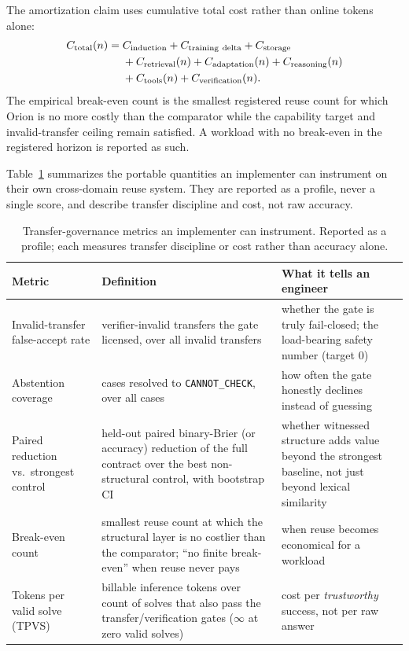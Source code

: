 The amortization claim uses cumulative total cost rather than online tokens alone:
\[
\begin{aligned}
C_{\rm total}(n)={}&C_{\rm induction}+C_{\rm training\ delta}+C_{\rm storage}\\
&+C_{\rm retrieval}(n)+C_{\rm adaptation}(n)+C_{\rm reasoning}(n)\\
&+C_{\rm tools}(n)+C_{\rm verification}(n).
\end{aligned}
\]
The empirical break-even count is the smallest registered reuse count for which Orion is no more costly than the comparator while the capability target and invalid-transfer ceiling remain satisfied. A workload with no break-even in the registered horizon is reported as such.

Table~\ref{tab:transfer-metrics} summarizes the portable quantities an implementer can instrument on their own cross-domain reuse system. They are reported as a profile, never a single score, and describe transfer discipline and cost, not raw accuracy.

\begin{table}[t]
\footnotesize
\begin{tabular}{@{}p{} p{} p{}@{}}
\hline
\textbf{Metric} & \textbf{Definition} & \textbf{What it tells an engineer} \\
\hline
Invalid-transfer false-accept rate & verifier-invalid transfers the gate licensed, over all invalid transfers & whether the gate is truly fail-closed; the load-bearing safety number (target $0$) \\
Abstention coverage & cases resolved to \texttt{CANNOT\_CHECK}, over all cases & how often the gate honestly declines instead of guessing \\
Paired reduction vs.\ strongest control & held-out paired binary-Brier (or accuracy) reduction of the full contract over the best non-structural control, with bootstrap CI & whether witnessed structure adds value beyond the strongest baseline, not just beyond lexical similarity \\
Break-even count & smallest reuse count at which the structural layer is no costlier than the comparator; ``no finite break-even'' when reuse never pays & when reuse becomes economical for a workload \\
Tokens per valid solve (TPVS) & billable inference tokens over count of solves that also pass the transfer/verification gates ($\infty$ at zero valid solves) & cost per \emph{trustworthy} success, not per raw answer \\
\hline
\end{tabular}
\caption{Transfer-governance metrics an implementer can instrument. Reported as a profile; each measures transfer discipline or cost rather than accuracy alone.}
\label{tab:transfer-metrics}
\end{table}

